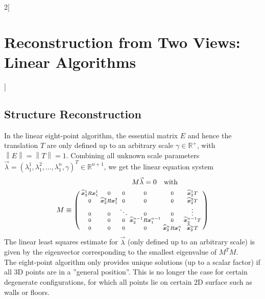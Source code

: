 \documentclass[oneside,fontsize=11pt,paper=a4]{scrartcl}
\begin{document}
\begin{multicols}{2}[\section{Reconstruction from Two Views: Linear Algorithms}]
\subsection{Structure Reconstruction}
In the linear eight-point algorithm, the essential matrix $E$ and hence the translation $T$ are only defined up to an arbitrary scale $\gamma \in \mathbb{R}^{+}$, with $\left\| E \right\| = \left\| T \right\| = 1$. Combining all unknown scale parameters $\vec{\lambda} = \left(\lambda_1^1, \lambda_1^2, \dots , \lambda_1^n, \gamma\right)^T \in \mathbb{R}^{n+1}$, we get the linear equation system
\begin{equation*}
	\begin{split}
		M \vec{\lambda} = 0 \text{\quad with \qquad \qquad} \\
		M \equiv
		\begin{psmallmatrix}
			\widehat{\boldsymbol{x}}_2^1 R \boldsymbol{x}_1^1 & 0 & 0 & 0 & 0 & \widehat{\boldsymbol{x}}_2^1 T \\
			0 & \widehat{\boldsymbol{x}}_2^2 R \boldsymbol{x}_1^2 & 0 & 0 & 0 & \widehat{\boldsymbol{x}}_2^2 T \\
			0 & 0 & \ddots & 0 & 0 & \vdots \\
			0 & 0 & 0 & \widehat{\boldsymbol{x}}_2^{n-1} R \boldsymbol{x}_1^{n-1} & 0 & \widehat{\boldsymbol{x}}_2^{n-1} T \\
			0 & 0 & 0 & 0 & \widehat{\boldsymbol{x}}_2^n R \boldsymbol{x}_1^n & \widehat{\boldsymbol{x}}_2^n T
		\end{psmallmatrix}
	\end{split}
\end{equation*}
The linear least squares estimate for $\vec{\lambda}$ (only defined up to an arbitrary scale) is given by the eigenvector corresponding to the smallest eigenvalue of $M^TM$. \\

The eight-point algorithm only provides unique solutions (up to a scalar factor) if all 3D points are in a ''general position''.
This is no longer the case for certain degenerate configurations, for which all points lie on certain 2D surface such as walls or floors.


\end{multicols}
\end{document}
